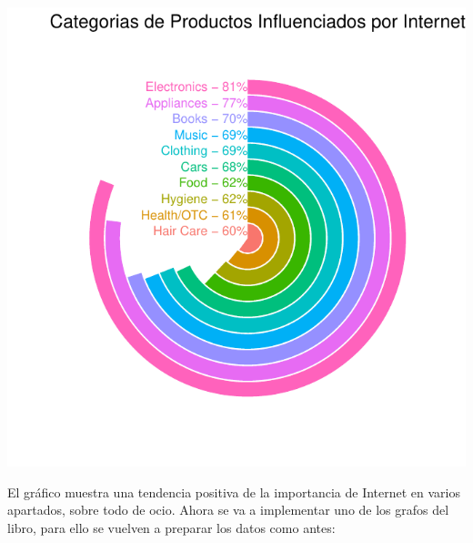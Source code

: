\documentclass{article}\usepackage[]{graphicx}\usepackage[]{color}
\makeatletter
\def\maxwidth{ %
  \ifdim\Gin@nat@width>\linewidth
    \linewidth
  \else
    \Gin@nat@width
  \fi
}
\newenvironment{knitrout}{}{} %
\makeatother
\begin{document}
\begin{knitrout}
\color{fgcolor}

{\centering \includegraphics[width=\maxwidth]{figure/plot_ggp_cb-1} 

}



\end{knitrout}
El gr\'afico muestra una tendencia positiva de la importancia de Internet en varios apartados, sobre todo de ocio.
\clearpage
Ahora se va a implementar uno de los grafos del libro\cite[p\'ag 76]{Circle}, para ello se vuelven a preparar los datos como antes:
\end{document}
